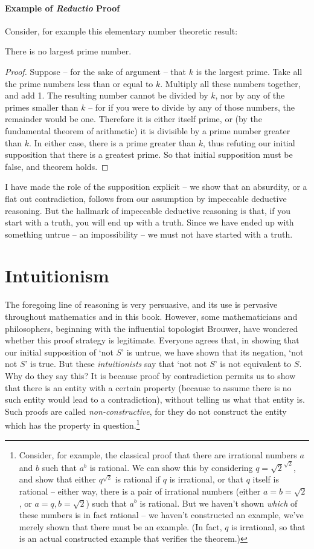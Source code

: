\paragraph{Example of \emph{Reductio} Proof} Consider, for example this elementary number theoretic result: \begin{theorem} There is no largest prime number. \begin{proof}
Suppose – for the sake of argument – that $k$ is the largest prime. Take all the prime numbers less than or equal to $k$. Multiply all these numbers together, and add 1. The resulting number cannot be divided by $k$, nor by any of the primes smaller than $k$ – for if you were to divide by any of those numbers, the remainder would be one. Therefore it is either itself prime, or (by the fundamental theorem of arithmetic) it is divisible by a prime number greater than $k$. In either case, there is a prime greater than $k$, thus refuting our initial supposition that there is a greatest prime. So that initial supposition must be false, and theorem holds.
\end{proof}\end{theorem} I have made the role of the supposition explicit – we show that an absurdity, or a flat out contradiction, follows from our assumption by impeccable deductive reasoning. But the hallmark of impeccable deductive reasoning is that, if you start with a truth, you will end up with a truth. Since we have ended up with something untrue – an impossibility – we must not have started with a truth.

\section{Intuitionism} The foregoing line of reasoning is very persuasive, and its use is pervasive throughout mathematics and in this book. However, some mathematicians and philosophers, beginning with the influential topologist Brouwer, have wondered whether this proof strategy is legitimate. Everyone agrees that, in showing that our initial supposition of `not $S$' is untrue, we have shown that its negation, `not not $S$' is true. But these \emph{intuitionists} say that `not not $S$' is not equivalent to $S$. Why do they say this? It is because proof by contradiction permits us to show that there is an entity with a certain property (because to assume there is no such entity would lead to a contradiction), without telling us what that entity is. Such proofs are called \emph{non-constructive}, for they do not construct the entity which has the property in question.\footnote{Consider, for example, the classical proof that there are irrational numbers $a$ and $b$ such that $a^{b}$ is rational. We can show this by considering $q=\sqrt{2}^{\sqrt{2}}$, and show that either $q^{\sqrt{2}}$ is rational if $q$ is irrational, or that $q$ itself is rational – either way, there is a pair of irrational numbers (either $a = b = \sqrt{2}$, or $a=q, b=\sqrt{2}$) such that $a^{b}$ is rational. But we haven't shown \emph{which} of these numbers is in fact rational – we haven't constructed an example, we've merely shown that there must be an example. (In fact, $q$ is irrational, so that is an actual constructed example that verifies the theorem.)} 

